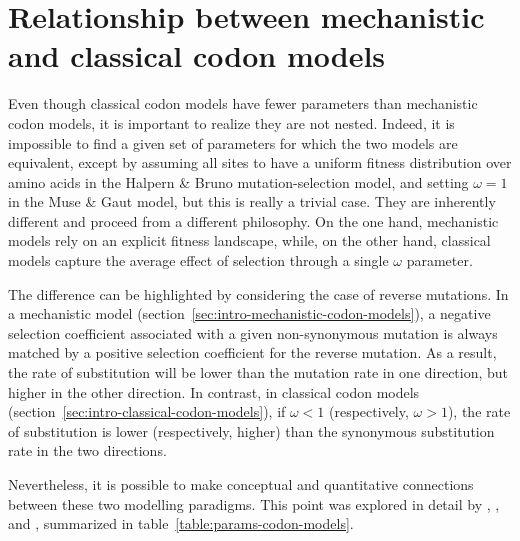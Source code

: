 \section{Relationship between mechanistic and classical codon models}
\label{sec:relationship-between-mechanistic-and-classical-codon-models}

Even though classical codon models have fewer parameters than mechanistic codon models, it is important to realize they are not nested.
Indeed, it is impossible to find a given set of parameters for which the two models are equivalent, except by assuming all sites to have a uniform fitness distribution over amino acids in the Halpern \& Bruno mutation-selection model, and setting $\omega = 1$ in the Muse \& Gaut model, but this is really a trivial case.
They are inherently different and proceed from a different philosophy.
On the one hand, mechanistic models rely on an explicit fitness landscape, while, on the other hand, classical models capture the average effect of selection through a single $\omega$ parameter.

The difference can be highlighted by considering the case of reverse mutations.
In a mechanistic model (section~\ref{sec:intro-mechanistic-codon-models}), a negative selection coefficient associated with a given non-synonymous mutation is always matched by a positive selection coefficient for the reverse mutation.
As a result, the rate of substitution will be lower than the mutation rate in one direction, but higher in the other direction.
In contrast, in classical codon models (section~\ref{sec:intro-classical-codon-models}), if $\omega < 1$ (respectively, $\omega> 1$), the rate of substitution is lower (respectively, higher) than the synonymous substitution rate in the two directions.

Nevertheless, it is possible to make conceptual and quantitative connections between these two modelling paradigms.
This point was explored in detail by \citet{Spielman2015}, \citet{DosReis2015}, \citet{Jones2016} and \citet{Rodrigue2016}, summarized in table~\ref{table:params-codon-models}.

